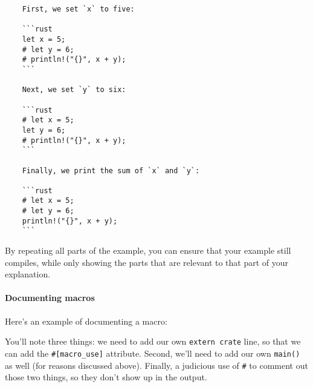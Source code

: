 \documentclass[a4paper,]{book}
\newenvironment{Shaded}{\begin{snugshade}}{\end{snugshade}}
\newcommand{\KeywordTok}[1]{\textcolor[rgb]{0.13,0.29,0.53}{\textbf{{#1}}}}
\newcommand{\CommentTok}[1]{\textcolor[rgb]{0.56,0.35,0.01}{\textit{{#1}}}}
\newcommand{\OtherTok}[1]{\textcolor[rgb]{0.56,0.35,0.01}{{#1}}}
\newcommand{\NormalTok}[1]{{#1}}
\let\oldparagraph\paragraph
\renewcommand{\paragraph}[1]{\oldparagraph{#1}\mbox{}}
\begin{document}
\begin{verbatim}
    First, we set `x` to five:

    ```rust
    let x = 5;
    # let y = 6;
    # println!("{}", x + y);
    ```

    Next, we set `y` to six:

    ```rust
    # let x = 5;
    let y = 6;
    # println!("{}", x + y);
    ```

    Finally, we print the sum of `x` and `y`:

    ```rust
    # let x = 5;
    # let y = 6;
    println!("{}", x + y);
    ```
\end{verbatim}

By repeating all parts of the example, you can ensure that your example
still compiles, while only showing the parts that are relevant to that
part of your explanation.

\paragraph{Documenting macros}\label{documenting-macros}

Here's an example of documenting a macro:

\begin{Shaded}
\end{Shaded}

You'll note three things: we need to add our own \texttt{extern\ crate}
line, so that we can add the \texttt{\#{[}macro\_use{]}} attribute.
Second, we'll need to add our own \texttt{main()} as well (for reasons
discussed above). Finally, a judicious use of \texttt{\#} to comment out
those two things, so they don't show up in the output.
\end{document}

